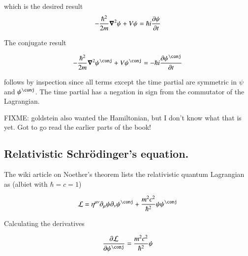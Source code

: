\documentclass{article}
\begin{document}
which is the desired result
\begin{align*}
-\frac{\hbar^2}{2 m} \boldsymbol{\nabla}^2 \psi + V\psi &= {\hbar i}{} \frac{\partial {\psi}}{\partial {t}} \\
\end{align*}

The conjugate result

%
\begin{align}\label{eqn:schrod}
-\frac{\hbar^2}{2 m} \spacegrad^2 \psi^\conj + V\psi^\conj &= -{\hbar i}{} \PD{t}{\psi^\conj} \\
\end{align}

follows by inspection since all terms except the time partial are symmetric in $\psi$ and $\psi^\conj$.  The time partial has a negation in sign from the commutator of the Lagrangian.

FIXME: goldstein also wanted the Hamiltonian, but I don't know what that is yet.  Got to go read the earlier parts of the book!

\subsection{ Relativistic Schr\"{o}dinger's equation. }

The wiki article on Noether's theorem lists the relativistic quantum Lagrangian as (albiet with $\hbar = c = 1$)

\begin{align*}
\LL = \eta^{\mu\nu}\partial_\mu \psi \partial_\nu \psi^\conj + \frac{m^2 c^2}{\hbar^2}\psi \psi^\conj
\end{align*}

Calculating the derivatives

\begin{align*}
\PD{\psi^\conj}{\LL} = \frac{m^2 c^2}{\hbar^2} \psi
\end{align*}
\end{document}
